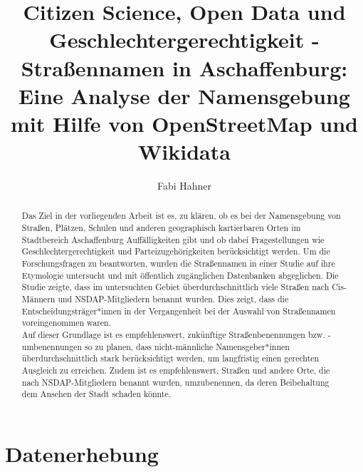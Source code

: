 \documentclass[ngerman,twocolumn,showpacs,%
  nofootinbib,aps,superscriptaddress,%
  eqsecnum,prd,notitlepage,showkeys,10pt,report]{revtex4-2}
\begin{document}
\renewcommand*{\tocname}{Inhaltsverzeichnis}
\renewcommand*{\lofname}{Abbildungsverzeichnis}

\title{Citizen Science, Open Data und Geschlechtergerechtigkeit - \\
Straßennamen in Aschaffenburg: Eine Analyse der Namensgebung\\
mit Hilfe von OpenStreetMap und Wikidata}
\author{Fabi Hahner}


\begin{abstract}
Das Ziel in der vorliegenden Arbeit ist es, zu klären, ob es bei der Namensgebung von
Straßen, Plätzen, Schulen und anderen geographisch kartierbaren Orten im Stadtbereich
Aschaffenburg Auffälligkeiten gibt und ob dabei Fragestellungen wie
Geschlechtergerechtigkeit und Parteizugehörigkeiten berücksichtigt werden.
Um die Forschungsfragen zu beantworten, wurden die Straßennamen in einer Studie auf
ihre Etymologie untersucht und mit öffentlich zugänglichen Datenbanken abgeglichen.
Die Studie zeigte, dass im untersuchten Gebiet überdurchschnittlich viele Straßen nach
Cis-Männern und NSDAP-Mitgliedern benannt wurden. Dies zeigt, dass die
Entscheidungsträger*innen in der Vergangenheit bei der Auswahl von Straßennamen
voreingenommen waren.\\
Auf dieser Grundlage ist es empfehlenswert, zukünftige Straßenbenennungen bzw.
-umbenennungen so zu planen, dass nicht-männliche Namensgeber*innen
überdurchschnittlich stark berücksichtigt werden, um langfristig einen gerechten Ausgleich
zu erreichen. Zudem ist es empfehlenswert, Straßen und andere Orte, die nach
NSDAP-Mitgliedern benannt wurden, umzubenennen, da deren Beibehaltung dem Ansehen
der Stadt schaden könnte.
\end{abstract}

\maketitle


\tableofcontents
\listoffigures
\newpage

\section{Datenerhebung}
\end{document}
